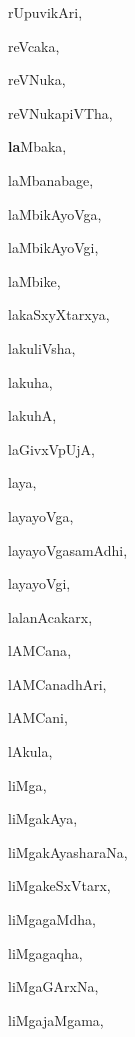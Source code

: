 \begin{multicols}{3}
{\noindent
{rUpuvikAri}, \pageref{rUpuvikAri}

\noindent
{reVcaka}, \pageref{reVcaka}

\noindent
{reVNuka}, \pageref{reVNuka}

\noindent
{reVNukapiVTha}, \pageref{reVNukapiVTha}

\noindent
{{\large\textbf{la}}Mbaka}, \pageref{laMbaka}

\noindent
{laMbanabage}, \pageref{laMbanabage}

\noindent
{laMbikAyoVga}, \pageref{laMbikAyoVga}

\noindent
{laMbikAyoVgi}, \pageref{laMbikAyoVgi}

\noindent
{laMbike}, \pageref{laMbike}

\noindent
{lakaSxyXtarxya}, \pageref{lakaSxyXtarxya}

\noindent
{lakuliVsha}, \pageref{lakuliVsha}

\noindent
{lakuha}, \pageref{lakuha}

\noindent
{lakuhA}, \pageref{lakuhA}

\noindent
{laGivxVpUjA}, \pageref{laGivxVpUjA}

\noindent
{laya}, \pageref{laya}

\noindent
{layayoVga}, \pageref{layayoVga}

\noindent
{layayoVgasamAdhi}, \pageref{layayoVgasamAdhi}

\noindent
{layayoVgi}, \pageref{layayoVgi}

\noindent
{lalanAcakarx}, \pageref{lalanAcakarx}

\noindent
{lAMCana}, \pageref{lAMCana}

\noindent
{lAMCanadhAri}, \pageref{lAMCanadhAri}

\noindent
{lAMCani}, \pageref{lAMCani}

\noindent
{lAkula}, \pageref{lAkula}

\noindent
{liMga}, \pageref{liMga}

\noindent
{liMgakAya}, \pageref{liMgakAya}

\noindent
{liMgakAyasharaNa}, \pageref{liMgakAyasharaNa}

\noindent
{liMgakeSxVtarx}, \pageref{liMgakeSxVtarx}

\noindent
{liMgagaMdha}, \pageref{liMgagaMdha}

\noindent
{liMgagaqha}, \pageref{liMgagaqha}

\noindent
{liMgaGArxNa}, \pageref{liMgaGArxNa}

\noindent
{liMgajaMgama}, \pageref{liMgajaMgama}

}
\end{multicols}
